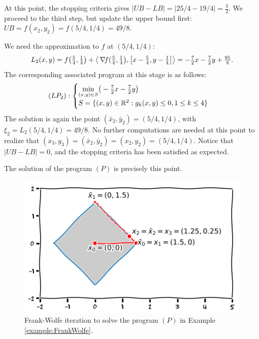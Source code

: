 \begin{example}
At this point, the stopping criteria gives $\lvert UB - LB \rvert = \lvert 25/4 - 19/4 \rvert = \tfrac{3}{2}$.  We proceed to the third step, but update the upper bound first: $UB=f(x_2,y_2)=f(5/4,1/4)=49/8$.

We need the approximation to $f$ at $(5/4, 1/4)$:
\begin{equation*}
L_2(x,y) = f\big(\tfrac{5}{4}, \tfrac{1}{4} \big) + \big\langle \mathop{\nabla\! {f}}(\tfrac{5}{4}, \tfrac{1}{4} \big), \big[ x - \tfrac{5}{4}, y-\tfrac{1}{4} \big] \big\rangle = -\tfrac{7}{2}x -\tfrac{7}{2}y + \tfrac{91}{8}.
\end{equation*}
The corresponding associated program at this stage is as follows:
\begin{equation*}
(LP_2): \begin{cases}
\displaystyle{\min_{(x,y) \in S}} \big( -\tfrac{7}{2}x -\tfrac{7}{2}y \big) \\
S = \{ (x,y) \in \mathbb{R}^2 : g_k(x,y) \leq 0, 1 \leq k \leq 4 \}
\end{cases}
\end{equation*}
The solution is again the point $(\bar{x}_2, \bar{y}_2) = (5/4, 1/4)$, with $\xi_2 = L_2(5/4,1/4) = 49/8$.  No further computations are needed at this point to realize that $(x_3,y_3)=(\bar{x}_2, \bar{y}_2)=(x_2,y_2)=(5/4, 1/4)$.  Notice that $\lvert UB-LB \rvert=0$, and the stopping criteria has been satisfied as expected.

The solution of the program $(P)$ is precisely this point.
\begin{figure}[ht!]
\includegraphics[width=0.75\linewidth]{images/frankwolfesequence.png}
\caption{Frank-Wolfe iteration to solve the program $(P)$ in Example \ref{example:FrankWolfe}.}
\end{figure}
\end{example}
